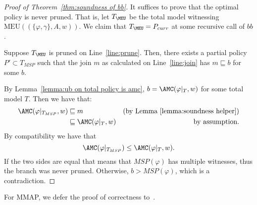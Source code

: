 \begin{proof}[Proof of Theorem~\ref{thm:soundness of bb}]
  It suffices to prove that the optimal policy is never pruned. 
  That is, let $T_{\MEU}$ be the total model witnessing 
  $\mathrm{MEU}((\{\varphi, \gamma\}, A, w))$. 
  We claim that $T_{\MEU} = P_{curr}$ at some recursive call of $bb$. 

  Suppose $T_{\MEU}$ is pruned on Line~\ref{line:prune}. Then, 
  there exists a partial policy $P' \subset T_{MSP}$ 
  such that 
  the join $m$ as calculated on Line~\ref{line:join} has
  $m \sqsubseteq b$ for some $b$. 

  By Lemma~\ref{lemma:ub on total policy is amc},
  $b = \AMC(\varphi|_T,w)$ for some total model $T$. 
  Then we have that:
  \begin{align*}
    \AMC( \varphi|_{T_{MSP}},w) 
      &\sqsubseteq m & \text{(by Lemma~\ref{lemma:soundness helper})} \\ 
      & \sqsubseteq \AMC( \varphi|_T , w) & \text{by assumption}.
  \end{align*}
  By compatibility we have that
  \begin{equation*}
    \AMC(\varphi|_{T_{MSP}}) \leq \AMC( \varphi|_T,w).
  \end{equation*}
  If the two sides are equal that means that 
  $MSP(\varphi)$ has multiple witnesses, 
  thus the branch was never pruned. 
  Otherwise, $b > MSP(\varphi)$, which is a contradiction.
\end{proof}

For MMAP, we defer the proof of correctness to~\citet{huang2006solving}.